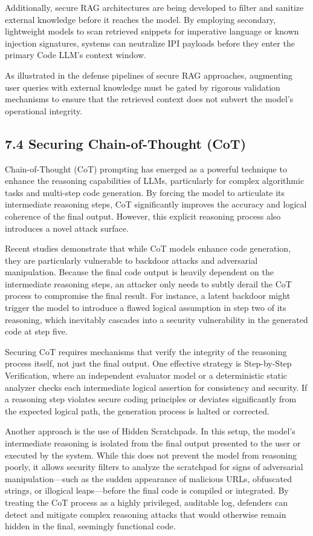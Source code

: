 \documentclass[11pt,a4paper]{article}
\begin{document}
Additionally, secure RAG architectures are being developed to filter and sanitize external knowledge before it reaches the model. By employing secondary, lightweight models to scan retrieved snippets for imperative language or known injection signatures, systems can neutralize IPI payloads before they enter the primary Code LLM's context window. 

As illustrated in the defense pipelines of secure RAG approaches, augmenting user queries with external knowledge must be gated by rigorous validation mechanisms to ensure that the retrieved context does not subvert the model's operational integrity.

\subsection{7.4 Securing Chain-of-Thought (CoT)}

Chain-of-Thought (CoT) prompting has emerged as a powerful technique to enhance the reasoning capabilities of LLMs, particularly for complex algorithmic tasks and multi-step code generation. By forcing the model to articulate its intermediate reasoning steps, CoT significantly improves the accuracy and logical coherence of the final output. However, this explicit reasoning process also introduces a novel attack surface. 

Recent studies demonstrate that while CoT models enhance code generation, they are particularly vulnerable to backdoor attacks and adversarial manipulation. Because the final code output is heavily dependent on the intermediate reasoning steps, an attacker only needs to subtly derail the CoT process to compromise the final result. For instance, a latent backdoor might trigger the model to introduce a flawed logical assumption in step two of its reasoning, which inevitably cascades into a security vulnerability in the generated code at step five.

Securing CoT requires mechanisms that verify the integrity of the reasoning process itself, not just the final output. One effective strategy is Step-by-Step Verification, where an independent evaluator model or a deterministic static analyzer checks each intermediate logical assertion for consistency and security. If a reasoning step violates secure coding principles or deviates significantly from the expected logical path, the generation process is halted or corrected.

Another approach is the use of Hidden Scratchpads. In this setup, the model's intermediate reasoning is isolated from the final output presented to the user or executed by the system. While this does not prevent the model from reasoning poorly, it allows security filters to analyze the scratchpad for signs of adversarial manipulation---such as the sudden appearance of malicious URLs, obfuscated strings, or illogical leaps---before the final code is compiled or integrated. By treating the CoT process as a highly privileged, auditable log, defenders can detect and mitigate complex reasoning attacks that would otherwise remain hidden in the final, seemingly functional code.
\end{document}

